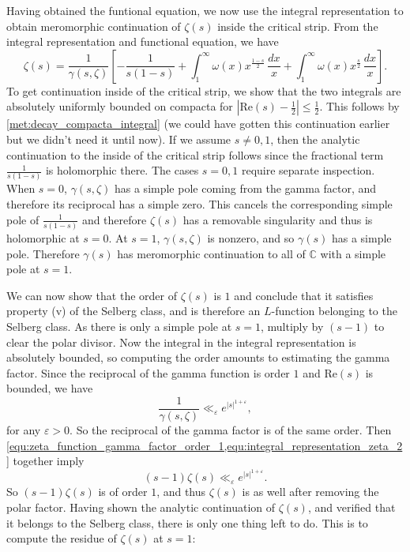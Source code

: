 \documentclass[12pt]{book}
\theoremstyle{definition}\newframedtheorem{method}{Method}
\newcommand{\C}{\mathbb{C}}
\newcommand{\g}{\gamma}
\newcommand{\z}{\zeta}
\newcommand{\w}{\omega}
\newcommand{\e}{\varepsilon}
\newcommand{\<}{\langle}
\renewcommand{\>}{\rangle}
\renewcommand{\Re}{\mathrm{Re}}
\begin{document}
      Having obtained the funtional equation, we now use the integral representation to obtain meromorphic continuation of $\z(s)$ inside the critical strip. From the integral representation and functional equation, we have
      \begin{equation}\label{equ:integral_representation_zeta_2}
        \z(s) = \frac{1}{\g(s,\z)}\left[-\frac{1}{s(1-s)}+\int_{1}^{\infty}\w(x)x^{\frac{1-s}{2}}\,\frac{dx}{x}+\int_{1}^{\infty}\w(x)x^{\frac{s}{2}}\,\frac{dx}{x}\right].
      \end{equation}
      To get continuation inside of the critical strip, we show that the two integrals are absolutely uniformly bounded on compacta for $|\Re(s)-\frac{1}{2}| \le \frac{1}{2}$. This follows by \cref{met:decay_compacta_integral} (we could have gotten this continuation earlier but we didn't need it until now). If we assume $s \neq 0,1$, then the analytic continuation to the inside of the critical strip follows since the fractional term $\frac{1}{s(1-s)}$ is holomorphic there. The cases $s = 0,1$ require separate inspection. When $s = 0$, $\g(s,\z)$ has a simple pole coming from the gamma factor, and therefore its reciprocal has a simple zero. This cancels the corresponding simple pole of $\frac{1}{s(1-s)}$ and therefore $\z(s)$ has a removable singularity and thus is holomorphic at $s = 0$. At $s = 1$, $\g(s,\z)$ is nonzero, and so $\g(s)$ has a simple pole. Therefore $\g(s)$ has meromorphic continuation to all of $\C$ with a simple pole at $s = 1$.

      We can now show that the order of $\z(s)$ is $1$ and conclude that it satisfies property (v) of the Selberg class, and is therefore an $L$-function belonging to the Selberg class. As there is only a simple pole at $s = 1$, multiply by $(s-1)$ to clear the polar divisor. Now the integral in the integral representation is absolutely bounded, so computing the order amounts to estimating the gamma factor. Since the reciprocal of the gamma function is order $1$ and $\Re(s)$ is bounded, we have
      \begin{equation}\label{equ:zeta_function_gamma_factor_order_1}
        \frac{1}{\g(s,\z)} \ll_{\e} e^{|s|^{1+\e}},
      \end{equation}
      for any $\e > 0$. So the reciprocal of the gamma factor is of the same order. Then \cref{equ:zeta_function_gamma_factor_order_1,equ:integral_representation_zeta_2} together imply
      \[
        (s-1)\z(s) \ll_{\e} e^{|s|^{1+\e}}.
      \]
      So $(s-1)\z(s)$ is of order $1$, and thus $\z(s)$ is as well after removing the polar factor. Having shown the analytic continuation of $\z(s)$, and verified that it belongs to the Selberg class, there is only one thing left to do. This is to compute the residue of $\z(s)$ at $s = 1$:
\end{document}
